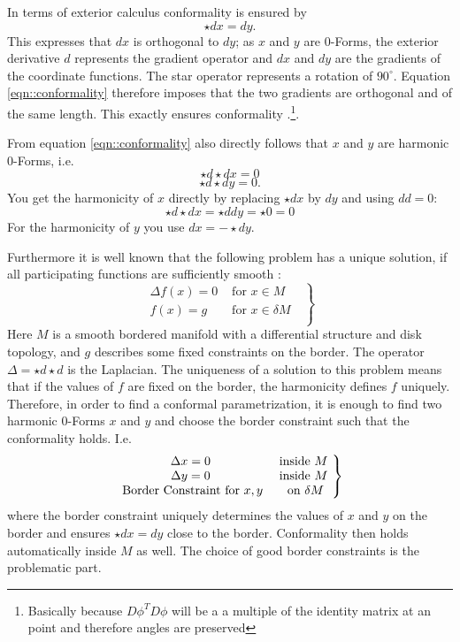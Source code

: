 In terms of exterior calculus conformality is ensured by
\begin{equation}
 \star dx = dy.
 \label{eqn::conformality}
\end{equation}
This expresses that $dx$ is orthogonal to $dy$; as $x$ and $y$ are $0$-Forms, the exterior derivative $d$ represents the gradient operator and $dx$ and $dy$ are the gradients of the coordinate functions. The star operator represents a rotation of $90^\circ$. Equation \ref{eqn::conformality} therefore imposes that the two gradients are orthogonal and of the same length. This exactly ensures conformality .\footnote{Basically because $D\phi^T D\phi$ will be a a multiple of the identity matrix at an point and therefore angles are preserved}.

From equation \ref{eqn::conformality} also directly follows that $x$ and $y$ are harmonic 0-Forms, i.e. 
\[\star d \star d x =0\]
\[ \star d \star d y = 0.\] 
You get the harmonicity of $x$ directly by replacing $\star d x $ by $dy$ and using $dd = 0$: 
\[\star d \star d x = \star ddy=  \star 0 = 0\]
For the harmonicity of $y$ you use $dx = -\star dy$.

Furthermore it is well known that the following problem has a unique solution, if all participating functions are sufficiently smooth :
\[\left.\begin{matrix}
 \Delta f(x) = 0 & \text{ for $x \in M$ } \\
  f(x) = g & \text{ for $x \in \delta M$ } \\
\end{matrix}\right\rbrace\]
Here $M$ is a smooth bordered manifold with a differential structure and disk topology, and $g$ describes some fixed constraints on the border. The operator $\Delta = \star d\star d$ is the Laplacian. The uniqueness of a solution to this problem means that if the values of $f$ are fixed on the border, the harmonicity defines $f$ uniquely. Therefore, in order to find a conformal parametrization, it is enough to find two harmonic 0-Forms $x$ and $y$ and choose the border constraint such that the conformality holds. I.e. 
\begin{equation}\left.\begin{matrix}
 \Delta x = 0 & \text{ inside $ M$ } \\
 \Delta y = 0 & \text{ inside $ M$ } \\
 \text{ Border Constraint for $x,y$} & \text{ on $ \delta M$} \\
\end{matrix}\right\rbrace \label{eq:conformalProblemStatement}\end{equation}
where the border constraint uniquely determines the values of $x$ and $y$ on the border and ensures $\star dx = dy$ close to the border. Conformality then holds automatically inside $M$ as well.  The choice of good border constraints is the problematic part.


